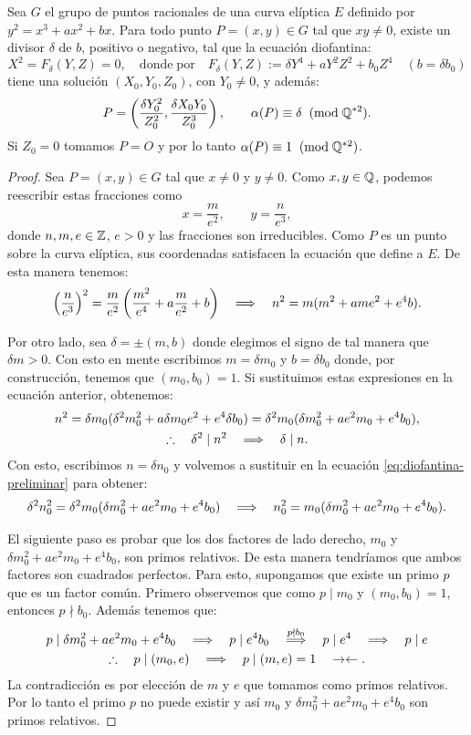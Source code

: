 \documentclass[../../tesis_maestria]{subfiles}
\begin{document}
\begin{lema}\label{lema:imagen-alpha}%
	Sea $G$ el grupo de puntos racionales de una curva elíptica $E$ definido por $y^2=x^3+ax^2+bx$. Para todo punto $P=(x,y)\in G$ tal que $xy\neq0$, existe un divisor $\delta$ de $b$, positivo o negativo, tal que la ecuación diofantina:
	\[
		X^2=F_\delta(Y,Z)=0,\quad\mathrm{donde}\;\mathrm{por}\quad
		F_\delta(Y,Z):=\delta Y^4+aY^2Z^2+b_0Z^4\quad(b=\delta b_0)
	\]
	tiene una solución $(X_0,Y_0,Z_0)$, con $Y_0\neq0$, y además:
	\[
		P=\left(\frac{\delta Y_0^2}{Z_0^2},\frac{\delta X_0 Y_0}{Z_0^3} \right),\qquad \alpha(P)\equiv\delta\;\;(\mathrm{mod}\; \mathbb{Q}^{*2}).
	\]
	Si $Z_0=0$ tomamos $P=O$ y por lo tanto $\alpha(P)\equiv 1 \;\;(\mathrm{mod}\; \mathbb{Q}^{*2})$.
\end{lema}
\begin{proof}
	Sea $P=(x,y)\in G$ tal que $x\neq0$ y $y\neq0$. Como $x,y\in\mathbb{Q}$, podemos reescribir estas fracciones como
	\[
		x=\frac{m}{e^2},\qquad y=\frac{n}{e^3},
	\]
	donde $n,m,e\in\mathbb{Z}$, $e>0$ y las fracciones son irreducibles. Como $P$ es un punto sobre la curva elíptica, sus coordenadas satisfacen la ecuación que define a $E$. De esta manera tenemos:
	\[
		\left( \frac{n}{e^3} \right)^2=\frac{m}{e^2}\left(\frac{m^2}{e^4}+a\frac{m}{e^2}+b\right) \quad\Longrightarrow\quad n^2=m(m^2+ame^2+e^4b).
	\]
	
	Por otro lado, sea $\delta=\pm(m,b)$ donde elegimos el signo de tal manera que $\delta m>0$. Con esto en mente escribimos $m=\delta m_0$ y $b=\delta b_0$ donde, por construcción, tenemos que $(m_0,b_0)=1$. Si sustituimos estas expresiones en la ecuación anterior, obtenemos:
	\begin{gather}
		n^2=\delta m_0(\delta^2m_0^2+a\delta m_0 e^2+e^4\delta b_0)=\delta^2m_0(\delta m_0^2+ae^2m_0+e^4b_0),\label{eq:diofantina-preliminar}\\
		\therefore\quad\delta^2\mid n^2\quad\Longrightarrow\quad \delta\mid n.\nonumber
	\end{gather}
Con esto, escribimos $n=\delta n_0$ y volvemos a sustituir en la ecuación \eqref{eq:diofantina-preliminar} para obtener:
	\begin{equation}\label{eq:diofantina-preliminar-2}
		\delta^2n_0^2=\delta^2m_0(\delta m_0^2+ae^2m_0+e^4b_0) \quad\Longrightarrow\quad n_0^2=m_0(\delta m_0^2+ae^2m_0+e^4b_0).
	\end{equation}
		
	El siguiente paso es probar que los dos factores de lado derecho, $m_0$ y $\delta m_0^2+ae^2m_0+e^4b_0$, son primos relativos. De esta manera tendríamos que ambos factores son cuadrados perfectos. Para esto, supongamos que existe un primo $p$ que es un factor común. Primero observemos que como $p\mid m_0$ y $(m_0,b_0)=1$, entonces $p\nmid b_0$. Además tenemos que:
	\begin{gather*}
		p\mid \delta m_0^2+ae^2m_0+e^4b_0 \quad\Longrightarrow\quad p\mid e^4b_0 \quad\overset{p\nmid b_0}{\Longrightarrow}\quad p\mid e^4 \quad\Longrightarrow\quad p\mid e\\
		\therefore\quad p\mid(m_0,e) \quad\Longrightarrow\quad p\mid (m,e)=1 \quad\rightarrow\leftarrow.
	\end{gather*}
La contradicción es por elección de $m$ y $e$ que tomamos como primos relativos. Por lo tanto el primo $p$ no puede existir y así $m_0$ y $\delta m_0^2+ae^2m_0+e^4b_0$ son primos relativos.


\end{proof}
\end{document}
